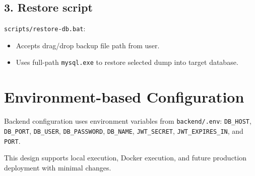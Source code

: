 \subsection*{3. Restore script}
\texttt{scripts/restore-db.bat}:
\begin{itemize}[leftmargin=1.3cm]
\item Accepts drag/drop backup file path from user.
\item Uses full-path \texttt{mysql.exe} to restore selected dump into target database.
\end{itemize}

\section{Environment-based Configuration}
Backend configuration uses environment variables from \texttt{backend/.env}:
\texttt{DB\_HOST}, \texttt{DB\_PORT}, \texttt{DB\_USER}, \texttt{DB\_PASSWORD}, \texttt{DB\_NAME}, \texttt{JWT\_SECRET}, \texttt{JWT\_EXPIRES\_IN}, and \texttt{PORT}.

This design supports local execution, Docker execution, and future production deployment with minimal changes.
